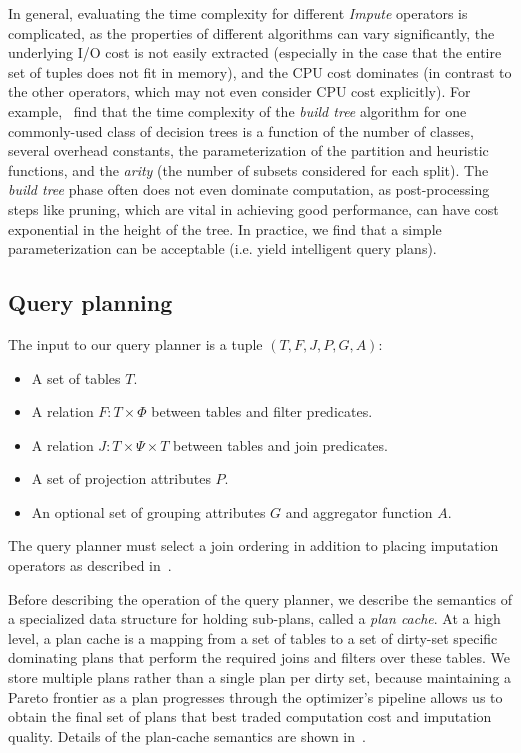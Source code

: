 In general, evaluating the time complexity for different \textit{Impute} operators is
complicated, as the properties of
different algorithms can vary significantly, the underlying I/O cost
is not easily extracted (especially in the case that the entire set of tuples does not
fit in memory), and the CPU cost dominates (in contrast to the other operators, which may
not even consider CPU cost explicitly). For example,~\cite{martin1995time} find that the
time complexity of the \textit{build tree} algorithm for one commonly-used class of
decision trees is a function of the number of classes, several overhead constants, the
parameterization of the partition and heuristic functions, and the \textit{arity} (the
number of subsets considered for each split). The \textit{build tree} phase often
does not even dominate computation, as post-processing steps like pruning, which are vital
in achieving good performance, can have cost exponential in the height of the tree. In
practice, we find that a simple parameterization can be acceptable (i.e. yield intelligent query
plans).

\subsection{Query planning}
\label{sec:planning}
The input to our query planner is a tuple $(T, F, J, P, G, A)$:
\begin{itemize}
\item A set of tables $T$.
\item A relation $F: T \times \Phi$ between tables and filter predicates.
\item A relation $J : T \times \Psi \times T$ between tables and join predicates.
\item A set of projection attributes $P$.
\item An optional set of grouping attributes $G$ and aggregator function $A$.
\end{itemize}

The query planner must select a join ordering in addition to placing imputation operators as described in~.

Before describing the operation of the query planner, we describe the semantics of a specialized data structure for holding sub-plans, called a \emph{plan cache}.
At a high level, a plan cache is a mapping from a set of tables to a set of dirty-set specific dominating plans that perform the required joins and filters over these tables.
We store multiple plans rather than a single plan per dirty set, because maintaining a Pareto frontier as a plan progresses through the optimizer's pipeline
allows us to obtain the final set of plans that best traded computation
cost and imputation quality. Details of the plan-cache semantics are shown in~.


